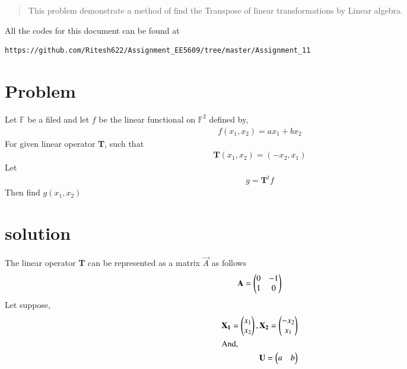 \documentclass[journal,12pt,twocolumn]{IEEEtran}
\begin{document}
	
	\maketitle
	\newpage
	\bigskip
	\renewcommand{\thefigure}{\theenumi}
	\renewcommand{\thetable}{\theenumi}

	\date{Today}
	

\begin{abstract}
This problem demonstrate a method of find the Transpose  of linear transformations  by Linear algebra.
\end{abstract}
All the codes for this document can be found at
\begin{lstlisting}
https://github.com/Ritesh622/Assignment_EE5609/tree/master/Assignment_11
\end{lstlisting}
\section{\textbf{Problem}}
Let  $\mathbb{F}$ be a filed and let $f$ be the linear functional on $\mathbb{F}^2$ defined by,
\begin{align}
f(x_1,x_2)  = ax_1 + bx_2 \label{1.1}
\end{align}
For given linear operator  \textbf{T}, such that
\begin{align}
\textbf{T}(x_1, x_2) = (-x_2, x_1)  \label{1.2}
\end{align}
Let 
\begin{align}
g = \textbf{T}^{t} f
\end{align}
Then find $g(x_1, x_2)$

\section{solution}
 The linear operator \textbf{T} can be represented as a matrix $\vec{A}$ as follows
 \begin{align}
\mathbf{A} = \begin{pmatrix}0 & -1 \\ 1 & 0\end{pmatrix}\\
\end{align}
Let suppose,
\begin{align}
\mathbf{X_1} = \begin{pmatrix}x_1 \\ x_2\end{pmatrix}, \mathbf{X_2} = \begin{pmatrix}-x_2 \\ x_1\end{pmatrix}\\
\intertext{And,}
\mathbf{U} = \begin{pmatrix}a & b\end{pmatrix}
\end{align}
\end{document}
